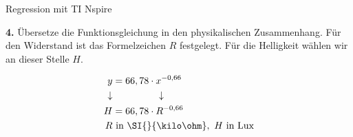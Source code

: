 \begin{zsfg}{Regression mit TI Nspire}
	\begin{minipage}[c][3cm][t]{0.48\textwidth}
		\textbf{4.} Übersetze die Funktionsgleichung in den physikalischen Zusammenhang. Für den Widerstand ist das Formelzeichen $R$ festgelegt. Für die Helligkeit wählen wir an dieser Stelle $H$.
	\end{minipage}
	\hfill
	\begin{minipage}[c][3cm][t]{0.48\textwidth}
		\centering
		\vspace{-\baselineskip}
		\begin{align*}
			y &= 66,78 \cdot x^{-0,66} \\
			\downarrow & \hspace{1.6cm}\downarrow \\
			H &= 66,78 \cdot R^{-0,66} \\
			R &\text{ in } \SI{}{\kilo\ohm}, ~ H \text{ in Lux} 
		\end{align*}
	\end{minipage}
\end{zsfg}
\vfill


